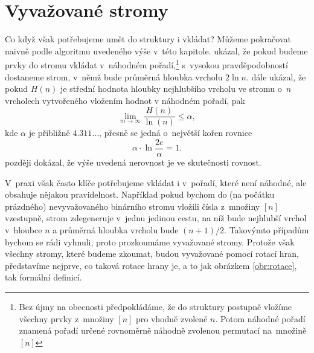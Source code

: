 \section{Vyvažované stromy}

Co když však potřebujeme umět do struktury i vkládat? Můžeme pokračovat naivně
podle algoritmu uvedeného výše v~této kapitole. \citet{sortingsearching}
ukázal, že pokud budeme prvky do stromu vkládat v~náhodném pořadí,\footnote{Bez
újmy na obecnosti předpokládáme, že do struktury postupně vložíme všechny prvky
z~množiny $[n]$ pro vhodně zvolené $n$. Potom náhodné pořadí znamená pořadí
určené rovnoměrně náhodně zvolenou permutací na~množině $[n]$} s~vysokou
pravděpodobností dostaneme strom, v~němž bude průměrná hloubka vrcholu $2 \ln n$.
\citet{Robson} dále ukázal, že pokud $H(n)$ je střední hodnota hloubky nejhlubšího 
vrcholu ve stromu o~$n$ vrcholech vytvořeného vložením hodnot v náhodném pořadí, pak $$\lim_{m\rightarrow
\infty}\frac{H(n)}{\ln(n)}\leq\alpha,$$ kde $\alpha$ je přibližně
$4.311\dots$, přesně se jedná o~největší kořen rovnice $$\alpha\cdot \ln
\frac{2e}{\alpha} = 1.$$ \citet{devroye} později dokázal, že výše uvedená
nerovnost je ve skutečnosti rovnost.

V~praxi však často klíče potřebujeme vkládat i v~pořadí, které není náhodné,
ale obsahuje nějakou pravidelnost. Například pokud bychom do (na počátku prázdného)
nevyvažovaného binárního stromu vložili čísla z~množiny $[n]$ vzestupně, strom
zdegeneruje v~jednu jedinou cestu, na níž bude nejhlubší vrchol v~hloubce $n$ a
průměrná hloubka vrcholu bude $(n+1)/2$. Takovýmto případům bychom se rádi
vyhnuli, proto prozkoumáme vyvažované stromy. Protože však všechny stromy,
které budeme zkoumat, budou vyvažované pomocí rotací hran, představíme nejprve,
co taková rotace hrany je, a to jak obrázkem \ref{obr:rotace}, tak formální definicí.


